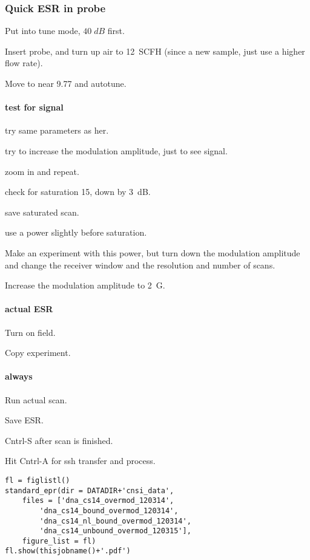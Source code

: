 \subsubsection{Quick ESR in probe}
Put into tune mode, $40\;dB$ first.

Insert probe, and turn up air to 12~SCFH (since a new sample, just use a higher flow rate).

Move to near 9.77 and autotune.

\paragraph{test for signal}
try same parameters as her.

try to increase the modulation amplitude, just to see signal.

zoom in and repeat.

check for saturation 15, down by 3~dB.

save saturated scan.

use a power slightly before saturation.

Make an experiment with this power, but turn down the modulation amplitude and change the receiver window and the resolution and number of scans.

Increase the modulation amplitude to 2~G.

\paragraph{actual ESR}
Turn on field.

Copy experiment.

\paragraph{always}
Run actual scan.

Save ESR.

Cntrl-S after scan is finished.

Hit Cntrl-A for ssh transfer and process.

\begin{tiny}
\begin{lstlisting}
fl = figlistl()
standard_epr(dir = DATADIR+'cnsi_data',
    files = ['dna_cs14_overmod_120314',
        'dna_cs14_bound_overmod_120314',
        'dna_cs14_nl_bound_overmod_120314',
        'dna_cs14_unbound_overmod_120315'],
    figure_list = fl)
fl.show(thisjobname()+'.pdf')
\end{lstlisting}
\end{tiny}

